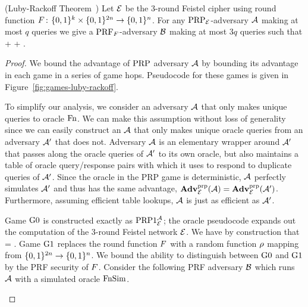 \begin{theorem}(Luby-Rackoff Theorem~\cite{LubyRackoff88})\label{thm:luby-rackoff}
Let ${\cal E}$ be the 3-round Feistel cipher using round function
$F{{\kern .05em}\colon{\kern .05em}}\{0,1\}^k\times\{0,1\}^{2n}\rightarrow \{0,1\}^n$. For any
$\textnormal{PRP}_{\cal E}$-adversary ${\mathcal A}$ making at most $q$ queries
we give a $\textnormal{PRF}_{F}$-adversary ${\mathcal B}$ making at most $3q$ queries such that
\bnm
  \AdvPRP{\Feistel}{\advA} \le \AdvPRF{\prf}{\advB} +  +
   \;.
\enm
\end{theorem}

\begin{proof}
We bound the advantage of $\textnormal{PRP}$ adversary ${\mathcal A}$ by bounding its advantage in each game in a series of game hops.
Pseudocode for these games is given in Figure~\ref{fig:games-luby-rackoff}.

To simplify our analysis, we consider an adversary ${\mathcal A}$ that only makes unique queries to oracle $\textnormal{Fn}$.
We can make this assumption without loss of generality since we can easily construct an ${\mathcal A}$ that only makes unique oracle queries from an adversary ${\mathcal A}'$ that does not.
Adversary ${\mathcal A}$ is an elementary wrapper around ${\mathcal A}'$ that passes along the oracle queries of ${\mathcal A}'$ to its own oracle, but also maintains a table of oracle query/response pairs with which it uses to respond to duplicate queries of ${\mathcal A}'$.
Since the oracle in the PRP game is deterministic, ${\mathcal A}$ perfectly simulates ${\mathcal A}'$ and thus has the same advantage, $\mathbf{Adv}^{\mathrm{prp}}_{{\cal E}}({\mathcal A}) = \mathbf{Adv}^{\mathrm{prp}}_{{\cal E}}({\mathcal A}')$.
Furthermore, assuming efficient table lookups, ${\mathcal A}$ is just as efficient as ${\mathcal A}'$.

Game ${{\textnormal G}}0$ is constructed exactly as $\textnormal{PRP}1^{{\mathcal A}}_{{\cal E}}$; the oracle pseudocode expands out the computation of the 3-round Feistel network ${\cal E}$.
We have by construction that
\bnm
{} = .
\enm
Game ${{\textnormal G}}1$ replaces the round function $F$ with a random function $\rho$ mapping from $\{0,1\}^{2n}\rightarrow\{0,1\}^n$.
We bound the ability to distinguish between ${{\textnormal G}}0$ and ${{\textnormal G}}1$ by the PRF security of $F$.
Consider the following PRF adversary ${\mathcal B}$ which runs ${\mathcal A}$ with a simulated oracle $\textnormal{FnSim}$.

\begin{center}
\end{center}
\end{proof}
